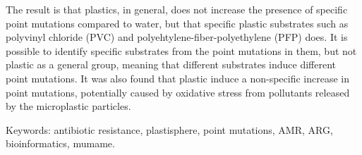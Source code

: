 The result is that plastics, in general, does not increase the presence of specific point mutations compared to water, but that specific plastic substrates such as polyvinyl chloride (PVC) and polyehtylene-fiber-polyethylene (PFP) does. 
It is possible to identify specific substrates from the point mutations in them, but not plastic as a general group, meaning that different substrates induce different point mutations. 
It was also found that plastic induce a non-specific increase in point mutations, potentially caused by oxidative stress from pollutants released by the microplastic particles.

\vfill
Keywords: antibiotic resistance, plastisphere, point mutations, AMR, ARG, bioinformatics, mumame.

\newpage				%
\thispagestyle{empty}
\mbox{}

